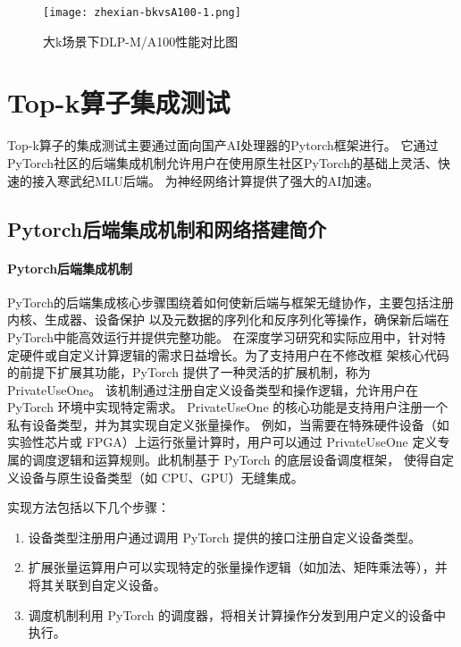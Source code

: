     
    \begin{figure}[ht]
        \centering
        \texttt{[image: zhexian-bkvsA100-1.png]}
        \caption{大k场景下DLP-M/A100性能对比图}
        \label{fig:bench_bk_vsa100_zhexian_1}
    \end{figure}
    

\section{Top-k算子集成测试}
Top-k算子的集成测试主要通过面向国产AI处理器的Pytorch框架进行。
它通过PyTorch社区的后端集成机制允许用户在使用原生社区PyTorch的基础上灵活、快速的接入寒武纪MLU后端。
为神经网络计算提供了强大的AI加速。


\subsection{Pytorch后端集成机制和网络搭建简介}
\paragraph{Pytorch后端集成机制}

PyTorch的后端集成核心步骤围绕着如何使新后端与框架无缝协作，主要包括注册内核、生成器、设备保护
以及元数据的序列化和反序列化等操作，确保新后端在PyTorch中能高效运行并提供完整功能。
在深度学习研究和实际应用中，针对特定硬件或自定义计算逻辑的需求日益增长。为了支持用户在不修改框
架核心代码的前提下扩展其功能，PyTorch 提供了一种灵活的扩展机制，称为 PrivateUseOne。
该机制通过注册自定义设备类型和操作逻辑，允许用户在 PyTorch 环境中实现特定需求。
PrivateUseOne 的核心功能是支持用户注册一个私有设备类型，并为其实现自定义张量操作。
例如，当需要在特殊硬件设备（如实验性芯片或 FPGA）上运行张量计算时，用户可以通过 
PrivateUseOne 定义专属的调度逻辑和运算规则。此机制基于 PyTorch 的底层设备调度框架，
使得自定义设备与原生设备类型（如 CPU、GPU）无缝集成。

实现方法包括以下几个步骤：
\begin{enumerate}
    \item {设备类型注册}用户通过调用 PyTorch 提供的接口注册自定义设备类型。
    \item{扩展张量运算}用户可以实现特定的张量操作逻辑（如加法、矩阵乘法等），并将其关联到自定义设备。
    \item{调度机制}利用 PyTorch 的调度器，将相关计算操作分发到用户定义的设备中执行。
\end{enumerate}

